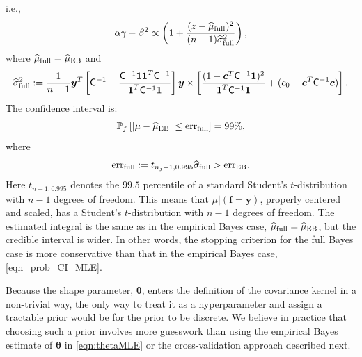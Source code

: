 \documentclass{iitthesis}          %
\newcommand{\bm}[1]{\boldsymbol{#1}}
\newcommand{\vtheta}{{\bm{\theta}}}
\newcommand{\vc}{\bm{c}}
\newcommand{\vf}{\bm{f}}
\newcommand{\vy}{\bm{y}}
\newcommand{\vone}{\bm{1}}
\newcommand{\mC}{\mathsf{C}}
\newcommand{\hmu}{\widehat{\mu}}
\newcommand{\hsigma}{\widehat{\sigma}}
\newcommand{\MLE}{\textup{EB}}
\newcommand{\err}{\textup{err}}
\begin{document}
i.e.,
\begin{align}
\label{eqn:full_bayes_student_short}
\alpha \gamma - \beta^2 \propto 
\left(
1 +  \frac{(z - \hmu_{\textup{full}})^2}{(n-1)\widehat{\sigma}_{\textup{full}}^2}
\right),
\end{align}
where $\hmu_{\textup{full}} = \hmu_{\MLE}$ and 
\begin{multline*}
\hsigma^2_{\textup{full}} 
:= \frac{1}{n-1}
\vy^T\left[ \mC^{-1} 
- \frac{ \mC^{-1} \vone\vone^T \mC^{-1}}{\vone^T \mC^{-1} \vone}  \right]\vy
\times  \left[\frac{(1 - \vc^T \mC^{-1} \vone)^2}{\vone^T \mC^{-1} \vone} + (c_0  -\vc ^T \mC^{-1} \vc) \right].
\end{multline*}
The confidence interval is:
\begin{equation}
\label{eqn_prob_CI_full}
\mathbb{P}_f \left[
|\mu-\hmu_\MLE| \leq \err_{\textup{full}} \right]  = 99\%,
\end{equation}
where
\begin{equation*}
\err_{\textup{full}} 
:= t_{n_j-1,0.995} \hsigma_{\textup{full}} > \err_\MLE .
\end{equation*}
Here $t_{n-1,0.995}$ denotes the $99.5$ percentile of a standard Student's $t$-distribution with $n-1$ degrees of freedom. 
This means that $\mu \vert (\vf = \vy )$, properly centered and scaled, has a Student's $t$-distribution with $n-1$ degrees of freedom.  
The estimated integral is the same as in the empirical Bayes case, $\hmu_{\textup{full}} = \hmu_{\MLE}$, but the credible interval is wider.
In other words, the stopping criterion for the full Bayes case is more conservative than that in the empirical Bayes case, \eqref{eqn_prob_CI_MLE}.


Because the shape parameter, $\vtheta$, enters the definition of the covariance kernel in a non-trivial way, the only way to treat it as a hyperparameter and assign a tractable prior would be for the prior to be discrete.  We believe in practice that choosing such a prior involves more guesswork than using the empirical Bayes estimate of $\vtheta$ in \eqref{eqn:thetaMLE} or the cross-validation approach described next.

\end{document}
